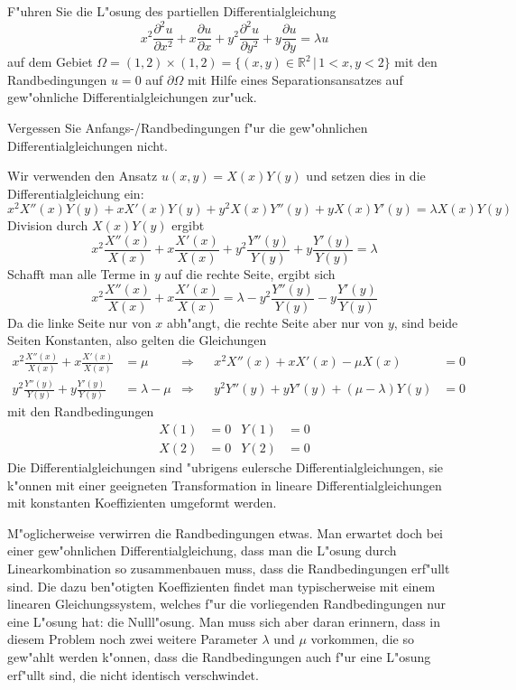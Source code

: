F"uhren Sie die L"osung des partiellen Differentialgleichung
\[
x^2\frac{\partial^2 u}{\partial x^2}
+x\frac{\partial u}{\partial x}
+y^2\frac{\partial^2 u}{\partial y^2}
+y\frac{\partial u}{\partial y}
=\lambda u
\]
auf dem Gebiet
$\Omega=(1,2)\times(1,2)=\{ (x,y)\in\mathbb R^2\,|\, 1<x,y<2\}$
mit den Randbedingungen $u=0$ auf $\partial\Omega$
mit Hilfe eines Separationsansatzes auf gew"ohnliche Differentialgleichungen
zur"uck.

\begin{hinweis}
Vergessen Sie Anfangs-/Randbedingungen f"ur die gew"ohnlichen
Differentialgleichungen nicht.
\end{hinweis}

\begin{loesung}
Wir verwenden den Ansatz $u(x,y)=X(x)Y(y)$ und setzen dies in die
Differentialgleichung ein:
\[
x^2X''(x)Y(y)
+xX'(x)Y(y)
+y^2X(x)Y''(y)
+yX(x)Y'(y)=\lambda X(x)Y(y)
\]
Division durch $X(x)Y(y)$ ergibt
\[
x^2\frac{X''(x)}{X(x)}
+x\frac{X'(x)}{X(x)}
+y^2\frac{Y''(y)}{Y(y)}
+y\frac{Y'(y)}{Y(y)}=\lambda
\]
Schafft man alle Terme in $y$ auf die rechte Seite, ergibt sich
\[
x^2\frac{X''(x)}{X(x)}
+x\frac{X'(x)}{X(x)}
=
\lambda
-y^2\frac{Y''(y)}{Y(y)}
-y\frac{Y'(y)}{Y(y)}
\]
Da die linke Seite nur von $x$ abh"angt, die rechte Seite aber nur
von $y$, sind beide Seiten Konstanten, also gelten die
Gleichungen
\begin{align*}
x^2\frac{X''(x)}{X(x)}
+x\frac{X'(x)}{X(x)}&=\mu
&\Rightarrow&
&
x^2X''(x)+xX'(x)-\mu X(x)&=0
\\
y^2\frac{Y''(y)}{Y(y)}
+y\frac{Y'(y)}{Y(y)}&=\lambda-\mu
&\Rightarrow&
&
y^2Y''(y)+yY'(y)+(\mu-\lambda) Y(y)&=0
\end{align*}
mit den Randbedingungen
\begin{align*}
X(1)&=0&Y(1)&=0\\
X(2)&=0&Y(2)&=0
\end{align*}
Die Differentialgleichungen sind "ubrigens eulersche Differentialgleichungen,
sie k"onnen mit einer geeigneten Transformation in lineare
Differentialgleichungen mit konstanten Koeffizienten umgeformt werden.
\end{loesung}

\begin{diskussion}
M"oglicherweise verwirren die Randbedingungen etwas.
Man erwartet doch bei einer gew"ohnlichen Differentialgleichung, dass
man die L"osung durch Linearkombination so zusammenbauen muss, dass die
Randbedingungen erf"ullt sind.
Die dazu ben"otigten Koeffizienten findet man typischerweise mit einem
linearen Gleichungssystem, welches f"ur die vorliegenden Randbedingungen
nur eine L"osung hat: die Nulll"osung.
Man muss sich aber daran erinnern, dass in diesem Problem noch zwei weitere
Parameter $\lambda$ und $\mu$ vorkommen, die so gew"ahlt werden k"onnen,
dass die Randbedingungen auch f"ur eine L"osung erf"ullt sind, die nicht
identisch verschwindet.
\end{diskussion}

